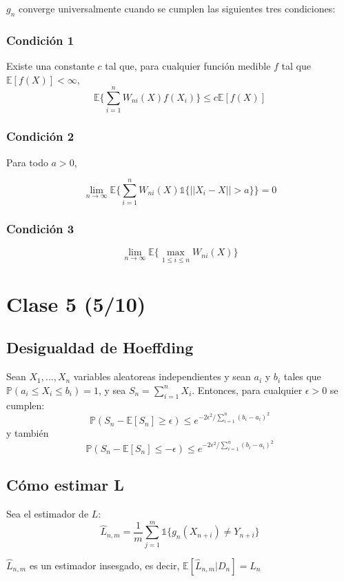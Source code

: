 \documentclass[12pt, a4paper]{article}
\begin{document}
$g_n$ converge universalmente cuando se cumplen las siguientes tres condiciones:

\subsubsection{Condición 1}
Existe una constante $c$ tal que, para cualquier función medible $f$ tal que $\mathds{E}[f(X)]<\infty$,
$$\mathds{E} \bigg \{ \sum_{i=1}^n W_{ni}(X)f(X_i) \bigg \} \leq c \mathds{E}[f(X)]$$

\subsubsection{Condición 2}
Para todo $a >0$,

$$\mathop{lim}_{ n \rightarrow \infty} \mathds{E} \bigg \{ \sum_{i=1}^n W_{ni}(X)\mathds{1}\{ || X_i -X ||>a \} \bigg \} = 0$$

\subsubsection{Condición 3}

$$ \mathop{lim}_{n \rightarrow \infty} \mathds{E} \bigg \{  \mathop{max}_{1 \leq i \leq n} W_{ni}(X)\bigg \} $$

\section{Clase 5 (5/10)}
\subsection{Desigualdad de Hoeffding}
Sean $X_1, ..., X_n$ variables aleatoreas independientes y sean $a_i$ y $b_i$ tales que $\mathds{P}(a_i \leq X_i \leq b_i)=1$, y sea $S_n=\sum_{i=1}^n X_i$. Entonces, para cualquier $\epsilon > 0$ se cumplen:
$$\mathds{P}(S_n - \mathds{E}[S_n] \geq \epsilon) \leq e^{-2 \epsilon^2 / \sum_{i=1}^n (b_i-a_i)^2}$$
y también
$$\mathds{P}(S_n - \mathds{E}[S_n] \leq - \epsilon) \leq e^{-2 \epsilon^2 / \sum_{i=1}^n (b_i-a_i)^2}$$

\subsection{Cómo estimar L}

Sea el estimador de $L$: $$\widehat{L}_{n,m}=\frac{1}{m} \sum_{j=1}^m \mathds{1} \bigg \{ g_n(X_{n+i}) \neq Y_{n+i} \bigg \}$$

$\widehat{L}_{n,m}$ es un estimador insesgado, es decir, $\mathds{E}[\widehat{L}_{n,m}|D_n]=L_n$
\end{document}
